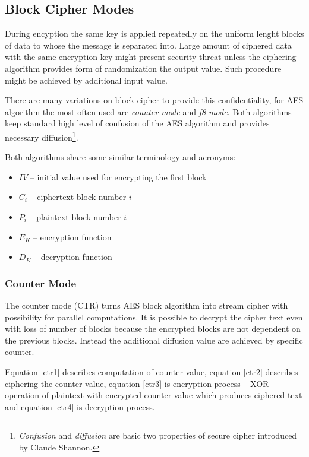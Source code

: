 \subsection{Block Cipher Modes}
During encyption the same key is applied repeatedly on the uniform lenght blocks
of data to whose the message is separated into. Large amount of ciphered data 
with the same encryption key might present security threat unless the ciphering
algorithm provides form of randomization the output value. Such procedure might
be achieved by additional input value.

There are many variations on block cipher to provide this confidentiality\cite{
blockciphers}, for AES algorithm the most often used are \textit{counter 
mode} and \textit{f8-mode}. Both algorithms keep standard high level of 
confusion of the AES algorithm and provides necessary diffusion\footnote{
\textit{Confusion} and \textit{diffusion} are basic two properties of secure 
cipher introduced by Claude Shannon\cite{shannon}.}.

Both algorithms share some similar terminology and acronyms:
\begin{itemize}
\item $IV$ -- initial value used for encrypting the first block
\item $C_i$ -- ciphertext block number $i$
\item $P_i$ -- plaintext block number $i$
\item $E_K$ -- encryption function
\item $D_K$ -- decryption function
\end{itemize}

\subsubsection*{Counter Mode}
The counter mode (CTR) turns AES block algorithm into stream cipher with 
possibility for parallel computations\cite{parallelctr}. It is possible to 
decrypt the cipher text even with loss of number of blocks because the encrypted
blocks are not dependent on the previous blocks. Instead the additional 
diffusion value are achieved by specific counter. 

Equation \ref{ctr1} describes computation of counter value, equation \ref{ctr2}
describes ciphering the counter value, equation \ref{ctr3} is encryption process
-- XOR operation of plaintext with encrypted counter value which produces 
ciphered text and equation \ref{ctr4} is decryption process.

